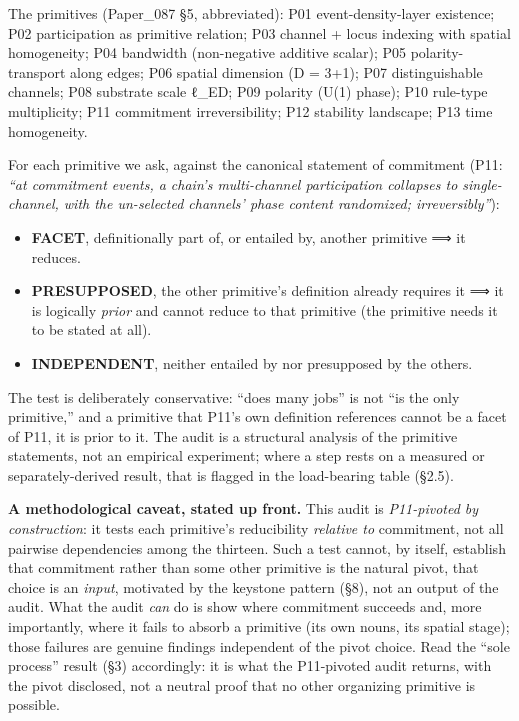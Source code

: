\documentclass[
  11pt,
]{article}
\providecommand{\tightlist}{%
  \setlength{\itemsep}{0pt}\setlength{\parskip}{0pt}}
\begin{document}
The primitives (Paper\_087 §5, abbreviated): P01 event-density-layer
existence; P02 participation as primitive relation; P03 channel + locus
indexing with spatial homogeneity; P04 bandwidth (non-negative additive
scalar); P05 polarity-transport along edges; P06 spatial dimension (D =
3+1); P07 distinguishable channels; P08 substrate scale ℓ\_ED; P09
polarity (U(1) phase); P10 rule-type multiplicity; P11 commitment
irreversibility; P12 stability landscape; P13 time homogeneity.

For each primitive we ask, against the canonical statement of commitment
(P11: \emph{``at commitment events, a chain's multi-channel
participation collapses to single-channel, with the un-selected
channels' phase content randomized; irreversibly''}):

\begin{itemize}
\tightlist
\item
  \textbf{FACET}, definitionally part of, or entailed by, another
  primitive ⟹ it reduces.
\item
  \textbf{PRESUPPOSED}, the other primitive's definition already
  requires it ⟹ it is logically \emph{prior} and cannot reduce to that
  primitive (the primitive needs it to be stated at all).
\item
  \textbf{INDEPENDENT}, neither entailed by nor presupposed by the
  others.
\end{itemize}

The test is deliberately conservative: ``does many jobs'' is not ``is
the only primitive,'' and a primitive that P11's own definition
references cannot be a facet of P11, it is prior to it. The audit is a
structural analysis of the primitive statements, not an empirical
experiment; where a step rests on a measured or separately-derived
result, that is flagged in the load-bearing table (§2.5).

\textbf{A methodological caveat, stated up front.} This audit is
\emph{P11-pivoted by construction}: it tests each primitive's
reducibility \emph{relative to} commitment, not all pairwise
dependencies among the thirteen. Such a test cannot, by itself,
establish that commitment rather than some other primitive is the
natural pivot, that choice is an \emph{input}, motivated by the keystone
pattern (§8), not an output of the audit. What the audit \emph{can} do
is show where commitment succeeds and, more importantly, where it fails
to absorb a primitive (its own nouns, its spatial stage); those failures
are genuine findings independent of the pivot choice. Read the ``sole
process'' result (§3) accordingly: it is what the P11-pivoted audit
returns, with the pivot disclosed, not a neutral proof that no other
organizing primitive is possible.
\end{document}
